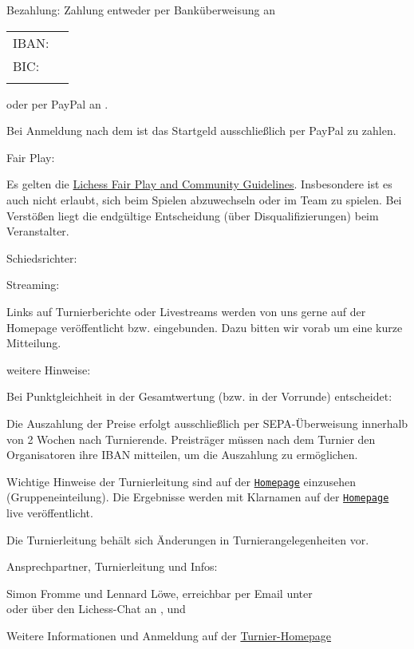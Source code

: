 \documentclass[paper=a4, fontsize=10pt]{scrartcl}
\begin{document}
\begin{basedescript}{\desclabelstyle{\multilinelabel}\desclabelwidth{10em}}
\item[Bezahlung:]
  Zahlung entweder per Banküberweisung an

  \hspace{2em}\begin{tabular}[t]{ll}
    IBAN: & \bankFormat{\IBAN} \\
    BIC:  & \bankFormat{\BIC} \\
          & \bankFormat{\bank}
  \end{tabular}

  oder per PayPal an \texttt{\paypalEmail}.

  Bei Anmeldung nach dem ist das
  Startgeld ausschließlich per PayPal zu zahlen.

\item[Fair Play:]

  Es gelten die \href{\lichessTermsOfServiceURL}{Lichess Fair Play and
    Community Guidelines}. Insbesondere ist es auch nicht erlaubt,
  sich beim Spielen abzuwechseln oder im Team zu spielen. Bei
  Verstößen liegt die endgültige Entscheidung (über
  Disqualifizierungen) beim Veranstalter.

\item[Schiedsrichter:]

  \arbiter{}

\item[Streaming:]

  Links auf Turnierberichte oder Livestreams werden von uns gerne auf
  der Homepage veröffentlicht bzw. eingebunden. Dazu bitten wir vorab
  um eine kurze Mitteilung.

\item[weitere Hinweise:]

  Bei Punktgleichheit in der Gesamtwertung (bzw. in der Vorrunde)
  entscheidet:

  \enum{\tiebreak}

  Die Auszahlung der Preise erfolgt ausschließlich per
  SEPA-Überweisung innerhalb von 2 Wochen nach
  Turnierende. Preisträger müssen nach dem Turnier den Organisatoren
  ihre IBAN mitteilen, um die Auszahlung zu ermöglichen.

  Wichtige Hinweise der Turnierleitung sind auf der
  \href{\tournamentURL}{\texttt{Homepage}} einzusehen
  (Gruppeneinteilung). Die Ergebnisse werden mit Klarnamen auf der
  \href{\tournamentURL}{\texttt{Homepage}} live veröffentlicht.

  Die Turnierleitung behält sich Änderungen in Turnierangelegenheiten
  vor.

\item[Ansprechpartner, Turnierleitung und Infos:]

  Simon Fromme und Lennard Löwe, erreichbar per Email unter
  \\ \email{\tournamentEmail} oder über den Lichess-Chat an
  ,  und

  Weitere Informationen und Anmeldung auf der
  \href{\tournamentURL}{Turnier-Homepage}
\end{basedescript}
\end{document}

